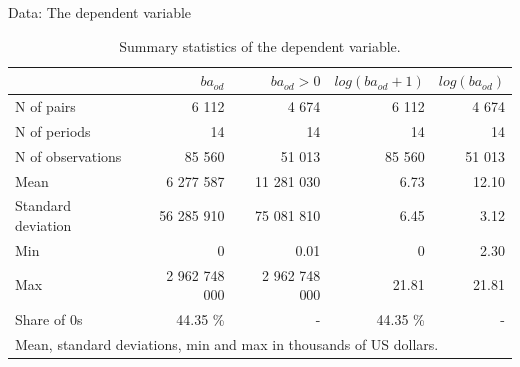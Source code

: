 \documentclass{beamer}
\begin{document}
\begin{frame}{Data: The dependent variable}
\begin{table}
\tiny
\centering
\begin{tabular}{l|r r r r}
\hline
 & $ba_{od}$ & $ba_{od} > 0$ & $log(ba_{od} + 1)$ & $log(ba_{od})$ \\ 
\hline
N of pairs & 6 112 & 4 674 & 6 112 & 4 674 \\
N of periods & 14 & 14 & 14 & 14 \\
N of observations & 85 560 & 51 013 & 85 560 & 51 013 \\
\hline
Mean & 6 277 587 & 11 281 030 & 6.73 & 12.10 \\
Standard deviation & 56 285 910 & 75 081 810 & 6.45 & 3.12 \\
Min & 0 & 0.01 & 0 & 2.30\\
Max & 2 962 748 000 & 2 962 748 000 & 21.81 & 21.81 \\
\hline
Share of 0s & 44.35 \% & - & 44.35 \% & -  \\
\hline 
\multicolumn{5}{l}{\tiny Mean, standard deviations, min and max in thousands of US dollars.}
\end{tabular}
\caption{Summary statistics of the dependent variable.}
\label{tab:ba_od}
\end{table}
\end{frame}



\end{document}
